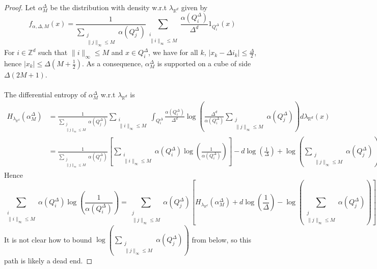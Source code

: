 \documentclass[12pt]{report}
\theoremstyle{definition}
\theoremstyle{remark}
\begin{document}
\begin{proof}
Let $\alpha^\Delta_M$ be the distribution with density w.r.t $\lambda_{\mathbb R^d}$ given by 
$$f_{\alpha,\Delta, M}(x) = \frac{1}{\sum \limits_{\substack{j\\ \|j\|_\infty\leq M}} \alpha(Q_j^\Delta)} \sum_{\substack{i\\ \|i\|_\infty\leq M}} \frac{\alpha(Q_i^\Delta)}{\Delta^d} 1_{Q_i^\Delta}(x)$$
For $i\in \mathbb Z^d$ such that $\|i\|_\infty\leq M$ and $x\in Q_i^\Delta$, we have for all $k$, $|x_k-\Delta i_k|\leq \frac{\Delta}2$, hence $|x_k|\leq \Delta(M+\frac 12)$. As a consequence, $\alpha^\Delta_M$ is supported on a cube of side $\Delta(2M+1)$.\\
\\
The differential entropy of $\alpha^\Delta_M$ w.r.t $\lambda_{\mathbb R^d}$ is 
$$\begin{aligned}H_{\lambda_{\mathbb R^d}}(\alpha^\Delta_M) 
&= 
\frac{1}{\sum \limits_{\substack{j\\ \|j\|_\infty\leq M}} \alpha(Q_j^\Delta)} \sum_{\substack{i\\ \|i\|_\infty\leq M}} \int_{Q_i^\Delta}\frac{\alpha(Q_i^\Delta)}{\Delta^d} \log\left(\frac{\Delta^d }{\alpha(Q_i^\Delta)} \sum \limits_{\substack{j\\ \|j\|_\infty\leq M}} \alpha(Q_j^\Delta) \right) d\lambda_{\mathbb R^d}(x)\\
&= \frac{1}{\sum \limits_{\substack{j\\ \|j\|_\infty\leq M}} \alpha(Q_j^\Delta)} \left[\sum_{\substack{i\\ \|i\|_\infty\leq M}} \alpha(Q_i^\Delta)\log\left(\frac{1}{\alpha(Q_i^\Delta)}\right)\right] - d \log\left(\frac{1 }{\Delta} \right) + \log\left(\sum_{\substack{j\\ \|j\|_\infty\leq M}} \alpha(Q_j^\Delta)\right)
\end{aligned}$$
Hence $$\sum_{\substack{i\\ \|i\|_\infty\leq M}} \alpha(Q_i^\Delta)\log\left(\frac{1}{\alpha(Q_i^\Delta)}\right) =
\sum_{\substack{j\\ \|j\|_\infty\leq M}} \alpha(Q_j^\Delta) \left[H_{\lambda_{\mathbb R^d}}(\alpha^\Delta_M) + d \log\left(\frac{1 }{\Delta} \right) - \log\left(\sum_{\substack{j\\ \|j\|_\infty\leq M}} \alpha(Q_j^\Delta)\right) \right]
$$
It is not clear how to bound $\log\left(\sum \limits_{\substack{j\\ \|j\|_\infty\leq M}} \alpha(Q_j^\Delta)\right)$ from below, so this path is likely a dead end.

\end{proof}
\end{document}
